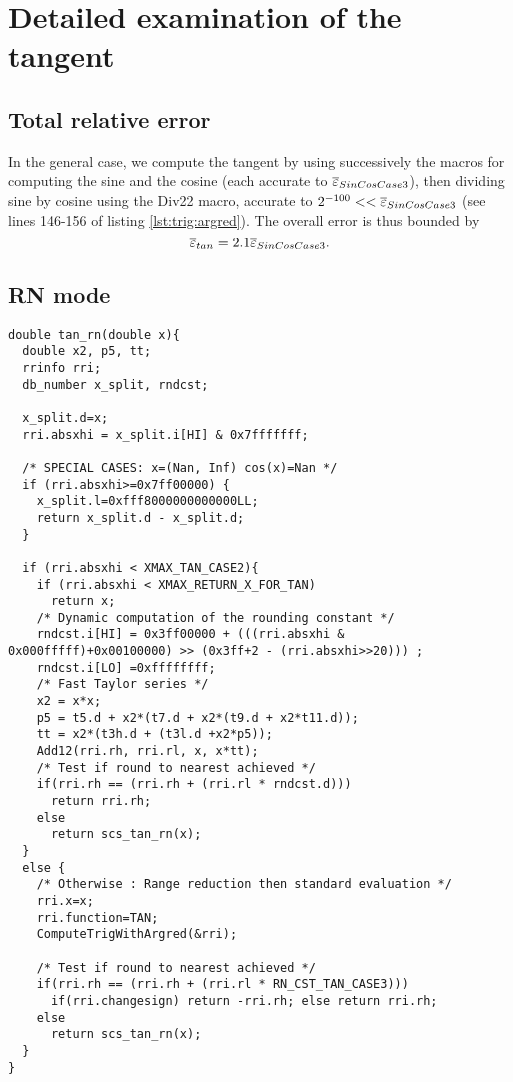 \section{Detailed examination of the tangent}

\subsection{Total relative error}
In the general case, we compute the tangent by using successively the
macros for computing the sine and the cosine (each accurate to
${\overline{\varepsilon}}_{SinCosCase3}$), then dividing sine by cosine using the Div22
macro, accurate to $2^{-100}<<{\overline{\varepsilon}}_{SinCosCase3}$ (see lines 146-156
of listing \ref{lst:trig:argred}). The overall error is thus bounded
by $${\overline{\varepsilon}}_{tan} = 2.1{\overline{\varepsilon}}_{SinCosCase3} .$$


\subsection{RN mode}
\begin{lstlisting}[caption={Exceptional cases for tangent RN},firstnumber=1]
double tan_rn(double x){  
  double x2, p5, tt;
  rrinfo rri;
  db_number x_split, rndcst;

  x_split.d=x;
  rri.absxhi = x_split.i[HI] & 0x7fffffff;

  /* SPECIAL CASES: x=(Nan, Inf) cos(x)=Nan */
  if (rri.absxhi>=0x7ff00000) {
    x_split.l=0xfff8000000000000LL;
    return x_split.d - x_split.d; 
  }   

  if (rri.absxhi < XMAX_TAN_CASE2){ 
    if (rri.absxhi < XMAX_RETURN_X_FOR_TAN) 
      return x;
    /* Dynamic computation of the rounding constant */
    rndcst.i[HI] = 0x3ff00000 + (((rri.absxhi & 0x000fffff)+0x00100000) >> (0x3ff+2 - (rri.absxhi>>20))) ;
    rndcst.i[LO] =0xffffffff;
    /* Fast Taylor series */
    x2 = x*x;
    p5 = t5.d + x2*(t7.d + x2*(t9.d + x2*t11.d));
    tt = x2*(t3h.d + (t3l.d +x2*p5));
    Add12(rri.rh, rri.rl, x, x*tt);  
    /* Test if round to nearest achieved */ 
    if(rri.rh == (rri.rh + (rri.rl * rndcst.d)))
      return rri.rh;
    else
      return scs_tan_rn(x); 
  }
  else {
    /* Otherwise : Range reduction then standard evaluation */
    rri.x=x;
    rri.function=TAN;
    ComputeTrigWithArgred(&rri);

    /* Test if round to nearest achieved */ 
    if(rri.rh == (rri.rh + (rri.rl * RN_CST_TAN_CASE3)))
      if(rri.changesign) return -rri.rh; else return rri.rh;
    else
      return scs_tan_rn(x); 
  }    
}
\end{lstlisting}

